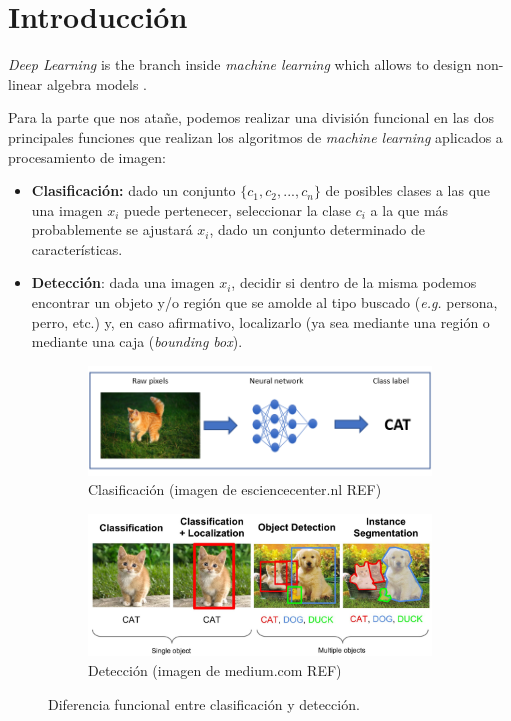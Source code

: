 \chapter*{Introducción}

\emph{Deep Learning} is the branch inside \emph{machine learning} which allows to design non-linear algebra models \cite{dl-nature}.


Para la parte que nos atañe, podemos realizar una división funcional en las dos principales funciones que realizan los algoritmos de \emph{machine learning} aplicados a procesamiento de imagen:

\begin{itemize}
	\item \textbf{Clasificación:} dado un conjunto $\{c_1, c_2, ..., c_n\}$ de posibles clases a las que una imagen $x_i$ puede pertenecer, seleccionar la clase $c_i$ a la que más probablemente se ajustará $x_i$, dado un conjunto determinado de características.
	\item \textbf{Detección}: dada una imagen $x_i$, decidir si dentro de la misma podemos encontrar un objeto y/o región que se amolde al tipo buscado (\emph{e.g.} persona, perro, etc.) y, en caso afirmativo, localizarlo (ya sea mediante una región o mediante una caja (\emph{bounding box}).
\end{itemize}

\begin{figure}[h]
	\centering
	\begin{subfigure}[h!]{0.6\textwidth}
		\includegraphics[width=\textwidth]{images/classification}
		\caption{Clasificación (imagen de esciencecenter.nl REF)}
		\label{fig:1_classification}
	\end{subfigure}
	
	\qquad
	
	\begin{subfigure}[h!]{0.6\textwidth}
		\includegraphics[width=\textwidth]{images/detection}
		\caption{Detección (imagen de medium.com REF)}
		\label{fig:1_detection}			
	\end{subfigure}
	
	\caption{Diferencia funcional entre clasificación y detección.}
	\label{fig:1_class_vs_det}
\end{figure}



